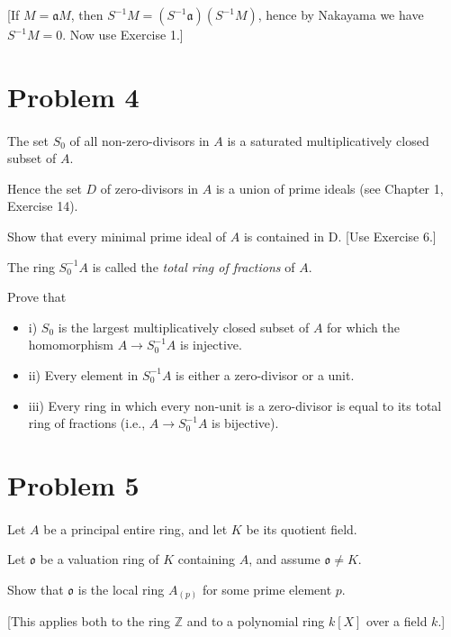 \documentclass{article}
\begin{document}
[If $M=\mathfrak{a} M$, then $S^{-1} M=\left(S^{-1} \mathfrak{a}\right)\left(S^{-1} M\right)$, hence by Nakayama we have $S^{-1} M=0$. Now use Exercise 1.]

\section*{Problem 4}\paragraph{}
The set $S_0$ of all non-zero-divisors in $A$ is a saturated multiplicatively closed subset of $A$.

Hence the set $D$ of zero-divisors in $A$ is a union of prime ideals (see Chapter 1, Exercise 14).

Show that every minimal prime ideal of $A$ is contained in D. [Use Exercise 6.]

The ring $S_0^{-1} A$ is called the \textit{total ring of fractions} of $A$.

Prove that

\begin{itemize}
    \item i) $S_0$ is the largest multiplicatively closed subset of $A$ for which the homomorphism $A \rightarrow S_0^{-1} A$ is injective.

    \item ii) Every element in $S_0^{-1} A$ is either a zero-divisor or a unit.

    \item iii) Every ring in which every non-unit is a zero-divisor is equal to its total ring of fractions (i.e., $A \rightarrow S_0^{-1} A$ is bijective).
\end{itemize}

\section*{Problem 5}\paragraph{}
Let $A$ be a principal entire ring, and let $K$ be its quotient field.

Let $\mathfrak{o}$ be a valuation ring of $K$ containing $A$, and assume $\mathfrak{o} \neq K$.

Show that $\mathfrak{o}$ is the local ring $A_{(p)}$ for some prime element $p$.

[This applies both to the ring $\mathbb{Z}$ and to a polynomial ring $k[X]$ over a field $k$.]
\end{document}
